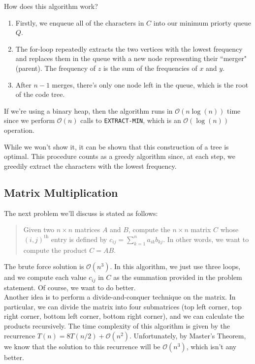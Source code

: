 How does this algorithm work?

\begin{enumerate}
    \item Firstly, we enqueue all of the characters in $C$ into our minimum priorty queue $Q$.
    \item The for-loop repeatedly extracts the two vertices with the lowest frequency and replaces them in the queue with a new node representing their ``merger" (parent). The frequency of $z$ is the sum of the frequencies of $x$ and $y$.
    \item After $n - 1$ merges, there's only one node left in the queue, which is the root of the code tree.
\end{enumerate}

If we're using a binary heap, then the algorithm runs in $\mathcal{O}(n\log(n))$ time since we perform $\mathcal{O}(n)$ calls to \verb!EXTRACT-MIN!, which is an $\mathcal{O}(\log(n))$ operation.


While we won't show it, it can be shown that this construction of a tree is optimal. This procedure counts as a greedy algorithm since, at each step, we greedily extract the characters with the lowest frequency.


\subsection{Matrix Multiplication}

The next problem we'll discuss is stated as follows:

\begin{quote}
    Given two $n\times n$ matrices $A$ and $B$, compute the $n \times n$ matrix $C$ whose $(i, j)^{\text{th}}$ entry is defined by $c_{ij} = \sum_{k=1}^{n}a_{ik} b_{kj}$. In other words, we want to compute the product $C = AB$. 
\end{quote}

The brute force solution is $\mathcal{O}(n^3)$. In this algorithm, we just use three loops, and we compute each value $c_{ij}$ in $C$ as the summation provided in the problem statement. Of course, we want to do better. \\

Another idea is to perform a divide-and-conquer technique on the matrix. In particular, we can divide the matrix into four submatrices (top left corner, top right corner, bottom left corner, bottom right corner), and we can calculate the products recursively. The time complexity of this algorithm is given by the recurrence $T(n) = 8T(n/2) + \mathcal{O}(n^2)$. Unfortunately, by Master's Theorem, we know that the solution to this recurrence will be $\mathcal{O}(n^3)$, which isn't any better. 